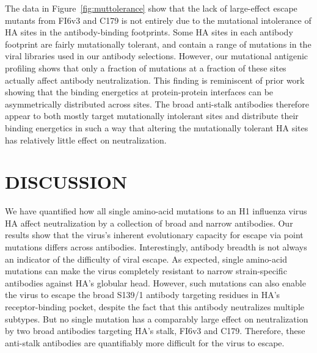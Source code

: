 \documentclass[11pt]{article}
\begin{document}
The data in Figure~\ref{fig:muttolerance} show that the lack of large-effect escape mutants from FI6v3 and C179 is not entirely due to the mutational intolerance of HA sites in the antibody-binding footprints.
Some HA sites in each antibody footprint are fairly mutationally tolerant, and contain a range of mutations in the viral libraries used in our antibody selections.
However, our mutational antigenic profiling shows that only a fraction of mutations at a fraction of these sites actually affect antibody neutralization.
This finding is reminiscent of prior work showing that the binding energetics at protein-protein interfaces can be asymmetrically distributed across sites\cite{jin1992high,cunningham1993comparison,dall1998mutational}.
The broad anti-stalk antibodies therefore appear to both mostly target mutationally intolerant sites and distribute their binding energetics in such a way that altering the mutationally tolerant HA sites has relatively little effect on neutralization.

\section*{DISCUSSION}
We have quantified how all single amino-acid mutations to an H1 influenza virus HA affect neutralization by a collection of broad and narrow antibodies.
Our results show that the virus's inherent evolutionary capacity for escape via point mutations differs across antibodies. 
Interestingly, antibody breadth is not always an indicator of the difficulty of viral escape. 
As expected, single amino-acid mutations can make the virus completely resistant to narrow strain-specific antibodies against HA's globular head.
However, such mutations can also enable the virus to escape the broad S139/1 antibody targeting residues in HA's receptor-binding pocket, despite the fact that this antibody neutralizes multiple subtypes.
But no single mutation has a comparably large effect on neutralization by two broad antibodies targeting HA's stalk, FI6v3 and C179.
Therefore, these anti-stalk antibodies are quantifiably more difficult for the virus to escape.
\end{document}
